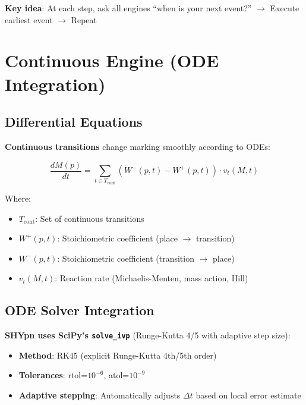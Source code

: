 \textbf{Key idea}: At each step, ask all engines ``when is your next event?'' $\to$ Execute earliest event $\to$ Repeat

\section{Continuous Engine (ODE Integration)}
\label{sec:continuous-engine}

\subsection{Differential Equations}
\label{subsec:ode-equations}

\textbf{Continuous transitions} change marking smoothly according to ODEs:

\begin{equation}
\frac{dM(p)}{dt} = \sum_{t \in T_{\text{cont}}} \left( W^-(p,t) - W^+(p,t) \right) \cdot v_t(M, t)
\end{equation}

Where:

\begin{itemize}
    \item $T_{\text{cont}}$: Set of continuous transitions
    \item $W^+(p,t)$: Stoichiometric coefficient (place $\to$ transition)
    \item $W^-(p,t)$: Stoichiometric coefficient (transition $\to$ place)
    \item $v_t(M, t)$: Reaction rate (Michaelis-Menten, mass action, Hill)
\end{itemize}

\subsection{ODE Solver Integration}
\label{subsec:ode-solver}

\textbf{SHYpn uses SciPy's \texttt{solve\_ivp}} (Runge-Kutta 4/5 with adaptive step size):

\begin{itemize}
    \item \textbf{Method}: RK45 (explicit Runge-Kutta 4th/5th order)
    \item \textbf{Tolerances}: rtol=$10^{-6}$, atol=$10^{-9}$
    \item \textbf{Adaptive stepping}: Automatically adjusts $\Delta t$ based on local error estimate
\end{itemize}


